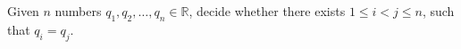 \begin{problem}
	Given \(n\) numbers \(q_1, q_2, \ldots, q_n \in \mathbb{R}\),
	decide whether there exists \(1 \leq i < j \leq n\),
	such that \(q_i = q_j\).
\end{problem}
